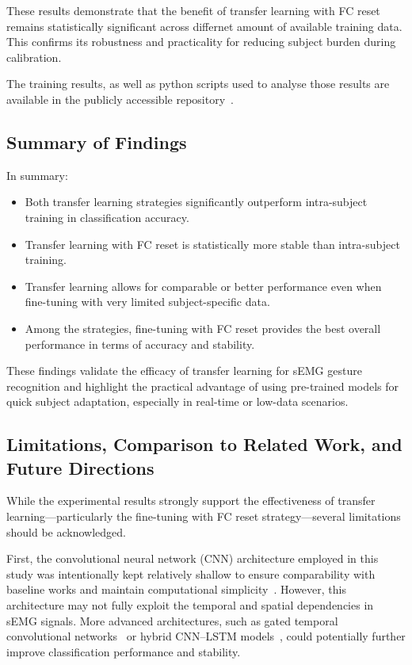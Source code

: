 \begin{multicols}{2}
These results demonstrate that the benefit of transfer learning with FC reset remains statistically significant across differnet amount of available training data. This confirms its robustness and practicality for reducing subject burden during calibration.

The training results, as well as python scripts used to analyse those results are available in the publicly accessible repository~\cite{Kolomiiets2025}.

\subsection*{Summary of Findings}

In summary:
\begin{itemize}
    \item Both transfer learning strategies significantly outperform intra-subject training in classification accuracy.
    \item Transfer learning with FC reset is statistically more stable than intra-subject training.
    \item Transfer learning allows for comparable or better performance even when fine-tuning with very limited subject-specific data.
    \item Among the strategies, fine-tuning with FC reset provides the best overall performance in terms of accuracy and stability.
\end{itemize}

These findings validate the efficacy of transfer learning for sEMG gesture recognition and highlight the practical advantage of using pre-trained models for quick subject adaptation, especially in real-time or low-data scenarios.

\subsection*{Limitations, Comparison to Related Work, and Future Directions}

While the experimental results strongly support the effectiveness of transfer learning—particularly the fine-tuning with FC reset strategy—several limitations should be acknowledged.

First, the convolutional neural network (CNN) architecture employed in this study was intentionally kept relatively shallow to ensure comparability with baseline works and maintain computational simplicity~\cite{Cote2019_3DC,LibEMG2023}. However, this architecture may not fully exploit the temporal and spatial dependencies in sEMG signals. More advanced architectures, such as gated temporal convolutional networks~\cite{Xie2024} or hybrid CNN–LSTM models~\cite{Faust2018}, could potentially further improve classification performance and stability.


\end{multicols}
